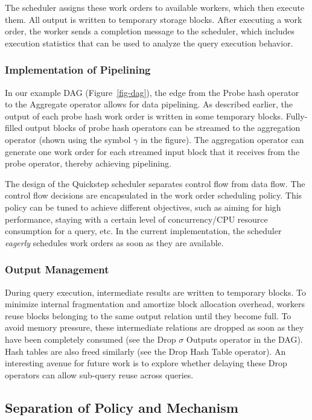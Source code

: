 The scheduler assigns these work orders to available workers, which then execute them. All output is written to temporary storage blocks. After executing a work order, the worker sends a completion message to the scheduler, which includes execution statistics that can be used %
to analyze the query execution behavior.

\subsubsection{Implementation of Pipelining}
In our example DAG (Figure~\ref{fig-dag}), the edge from the Probe hash operator to the Aggregate operator allows for data pipelining.
As described earlier, the output of each probe hash work order is written in some temporary blocks.
Fully-filled output blocks of probe hash operators can be streamed to the aggregation operator (shown using the symbol $\gamma$ in the figure).
The aggregation operator can generate one work order for each streamed input block that it receives from the probe operator, thereby achieving pipelining.

The design of the Quickstep scheduler separates control flow from data flow.
The control flow decisions are encapsulated in the work order scheduling policy.
This policy can be tuned to achieve different objectives, such as aiming for high performance, staying with a certain level of concurrency/CPU resource consumption for a query, etc.
In the current implementation, the scheduler \textit{eagerly} schedules work orders as soon as they are available.

\subsubsection{Output Management}
During query execution, intermediate results are written to temporary blocks. To minimize internal fragmentation and amortize block allocation overhead, workers reuse blocks belonging to the same output relation until they become full. To avoid memory pressure, these intermediate relations are dropped as soon as they have been completely consumed (see the Drop $\sigma$ Outputs operator in the DAG). Hash tables are also freed similarly (see the Drop Hash Table operator). An interesting avenue for future work is to explore whether delaying these Drop operators can allow sub-query reuse across queries.

 \subsection{Separation of Policy and Mechanism} \label{sec:scheduler-policy-vs-mechanism}


